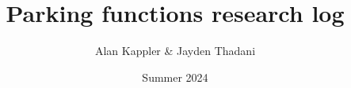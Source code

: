 \documentclass[titlepage,12pt]{article}
\title{Parking functions research log}
\author{Alan Kappler \& Jayden Thadani}
\date{Summer 2024}
\begin{document}
\maketitle


\nocite{*}


\end{document}
